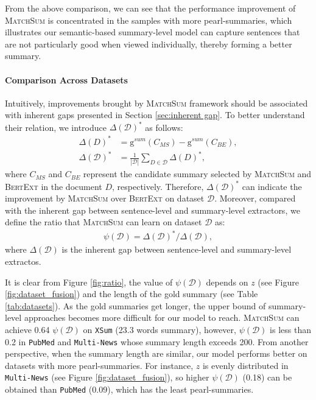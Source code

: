 From the above comparison, we can see that the performance improvement of \textsc{MatchSum} is concentrated in the samples with more pearl-summaries, which illustrates our semantic-based summary-level model can capture sentences that are not particularly good when viewed individually, thereby forming a better summary.

\paragraph{Comparison Across Datasets}
Intuitively, improvements brought by \textsc{MatchSum} framework should be associated with inherent gaps presented in Section \ref{sec:inherent gap}. To better understand their relation, we introduce $\Delta(\mathcal{D})^*$ as follows:
\begin{align}
    \Delta(D)^* &= \mathrm{g}^{sum}(C_{MS}) - \mathrm{g}^{sum}(C_{BE}), \\
    \Delta(\mathcal{D})^* &= \frac{1}{|\mathcal{D}|}\sum_{D\in \mathcal{D}}\Delta(D)^*,
\end{align}
where $C_{MS}$ and $C_{BE}$ represent the candidate summary selected by \textsc{MatchSum} and \textsc{BertExt} in the document $D$, respectively. Therefore, $\Delta(\mathcal{D})^*$ can indicate the improvement by \textsc{MatchSum} over \textsc{BertExt} on dataset $\mathcal{D}$. Moreover, compared with the inherent gap between sentence-level and summary-level extractors, we define the ratio that \textsc{MatchSum} can learn on dataset $\mathcal{D}$ as:
\begin{align}
    \psi(\mathcal{D}) = \Delta(\mathcal{D})^* / \Delta(\mathcal{D}),
\end{align}
where $\Delta(\mathcal{D})$ is the inherent gap between sentence-level and summary-level extractos.

It is clear from Figure \ref{fig:ratio}, the value of $\psi(\mathcal{D})$ depends on $z$ (see Figure \ref{fig:dataset_fusion}) and the length of the gold summary (see Table \ref{tab:datasets}). As the gold summaries get longer, the upper bound of summary-level approaches becomes more difficult for our model to reach. \textsc{MatchSum} can achieve 0.64 $\psi(\mathcal{D})$  on \texttt{XSum} (23.3 words summary), however, $\psi(\mathcal{D})$ is less than 0.2 in \texttt{PubMed} and \texttt{Multi-News} whose summary length exceeds 200. From another perspective, when the summary length are similar, our model performs better on datasets with more pearl-summaries. For instance, $z$ is evenly distributed in \texttt{Multi-News} (see Figure \ref{fig:dataset_fusion}), so higher $\psi(\mathcal{D})$ (0.18) can be obtained than \texttt{PubMed} (0.09), which has the least pearl-summaries.

